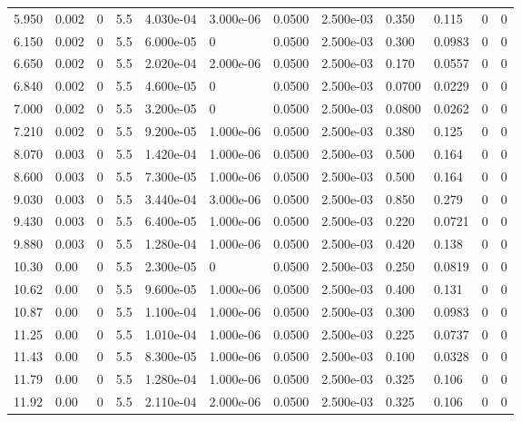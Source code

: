 \documentclass[preview]{standalone}
\begin{document}
{{\begin{tabular}{L{1.2cm}C{1.2cm} C{0.3cm}C{0.5cm} C{1.4cm}C{1.4cm} C{1.4cm}C{1.4cm} C{1.6cm}C{1.6cm} C{1.6cm}C{1.6cm}}
  5.950  &  0.002  & 0     & 5.5 &  4.030e-04  & 3.000e-06  &  0.0500&   2.500e-03& 0.350 & 0.115   &  0 & 0  \\ 
  6.150  &  0.002  & 0     & 5.5 &  6.000e-05  & 0  &  0.0500&   2.500e-03& 0.300 & 0.0983   &  0 & 0  \\ 
  6.650  &  0.002  & 0     & 5.5 &  2.020e-04  & 2.000e-06  &  0.0500&   2.500e-03& 0.170 & 0.0557   &  0 & 0  \\ 
  6.840  &  0.002  & 0     & 5.5 &  4.600e-05  & 0  &  0.0500&   2.500e-03& 0.0700 & 0.0229   &  0 & 0  \\ 
  7.000  &  0.002  & 0     & 5.5 &  3.200e-05  & 0  &  0.0500&   2.500e-03& 0.0800 & 0.0262   &  0 & 0  \\ 
  7.210  &  0.002  & 0     & 5.5 &  9.200e-05  & 1.000e-06  &  0.0500&   2.500e-03& 0.380 & 0.125   &  0 & 0  \\ 
  8.070  &  0.003  & 0     & 5.5 &  1.420e-04  & 1.000e-06  &  0.0500&   2.500e-03& 0.500 & 0.164   &  0 & 0  \\ 
  8.600  &  0.003  & 0     & 5.5 &  7.300e-05  & 1.000e-06  &  0.0500&   2.500e-03& 0.500 & 0.164   &  0 & 0  \\ 
  9.030  &  0.003  & 0     & 5.5 &  3.440e-04  & 3.000e-06  &  0.0500&   2.500e-03& 0.850 & 0.279   &  0 & 0  \\ 
  9.430  &  0.003  & 0     & 5.5 &  6.400e-05  & 1.000e-06  &  0.0500&   2.500e-03& 0.220 & 0.0721   &  0 & 0  \\ 
  9.880  &  0.003  & 0     & 5.5 &  1.280e-04  & 1.000e-06  &  0.0500&   2.500e-03& 0.420 & 0.138   &  0 & 0  \\ 
  10.30  &  0.00  & 0     & 5.5 &  2.300e-05  & 0  &  0.0500&   2.500e-03& 0.250 & 0.0819   &  0 & 0  \\ 
  10.62  &  0.00  & 0     & 5.5 &  9.600e-05  & 1.000e-06  &  0.0500&   2.500e-03& 0.400 & 0.131   &  0 & 0  \\ 
  10.87  &  0.00  & 0     & 5.5 &  1.100e-04  & 1.000e-06  &  0.0500&   2.500e-03& 0.300 & 0.0983   &  0 & 0  \\ 
  11.25  &  0.00  & 0     & 5.5 &  1.010e-04  & 1.000e-06  &  0.0500&   2.500e-03& 0.225 & 0.0737   &  0 & 0  \\ 
  11.43  &  0.00  & 0     & 5.5 &  8.300e-05  & 1.000e-06  &  0.0500&   2.500e-03& 0.100 & 0.0328   &  0 & 0  \\ 
  11.79  &  0.00  & 0     & 5.5 &  1.280e-04  & 1.000e-06  &  0.0500&   2.500e-03& 0.325 & 0.106   &  0 & 0  \\ 
  11.92  &  0.00  & 0     & 5.5 &  2.110e-04  & 2.000e-06  &  0.0500&   2.500e-03& 0.325 & 0.106   &  0 & 0  \\ 

\end{tabular}}}
\end{document}
